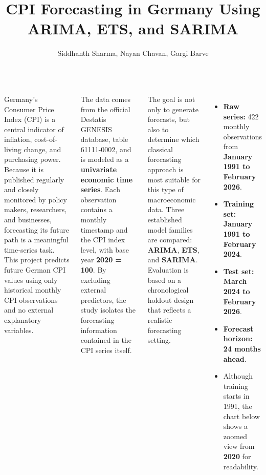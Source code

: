\documentclass[25pt,a0paper,portrait]{tikzposter}
\title{CPI Forecasting in Germany Using ARIMA, ETS, and SARIMA}
\author{Siddhanth Sharma, Nayan Chavan, Gargi Barve}
\begin{document}
\maketitle

\begin{columns}

{
	{
		Germany's Consumer Price Index (CPI) is a central indicator of inflation, cost-of-living change, and purchasing power. Because it is published regularly and closely monitored by policy makers, researchers, and businesses, forecasting its future path is a meaningful time-series task. This project predicts future German CPI values using only historical monthly CPI observations and no external explanatory variables.

		The data comes from the official Destatis GENESIS database, table 61111-0002, and is modeled as a \textbf{univariate economic time series}. Each observation contains a monthly timestamp and the CPI index level, with base year \textbf{2020 = 100}. By excluding external predictors, the study isolates the forecasting information contained in the CPI series itself.

		The goal is not only to generate forecasts, but also to determine which classical forecasting approach is most suitable for this type of macroeconomic data. Three established model families are compared: \textbf{ARIMA}, \textbf{ETS}, and \textbf{SARIMA}. Evaluation is based on a chronological holdout design that reflects a realistic forecasting setting.

		\vspace{0.8em}
	}

	{
		\begin{itemize}
			\item \textbf{Raw series:} 422 monthly observations from \textbf{January 1991 to February 2026}.

			\item \textbf{Training set:} \textbf{January 1991 to February 2024}.

			\item \textbf{Test set:} \textbf{March 2024 to February 2026}.

			\item \textbf{Forecast horizon:} \textbf{24 months ahead}.

			\item Although training starts in 1991, the chart below shows a zoomed view from \textbf{2020} for readability.
		\end{itemize}
	}

}
\end{columns}
\end{document}
